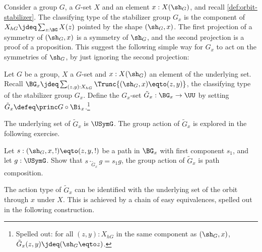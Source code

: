 Consider a group $G$, a $G$-set $X$ and an element $x:X(\sh_G)$,
and recall \cref{def:orbit-stabilizer}.
The classifying type of the stabilizer group $G_x$
is the component of $X_{hG}\jdeq\sum_{z:\BG} X(z)$ 
pointed by the shape $(\sh_G,x)$.
The first projection of a symmetry of $(\sh_G,x)$ is a symmetry of 
$\sh_G$, and the second projection is a proof of a proposition.
This suggest the following simple way for $G_x$ to act on the
symmetries of $\sh_G$, by just ignoring the second projection:


\begin{definition}\label{def:Gx-action-on-G}
Let $G$ be a group, $X$ a $G$-set and $x:X(\sh_G)$ an element of 
the underlying set. Recall 
$\BG_x \jdeq \sum_{(z,y):X_{hG}}\Trunc{(\sh_G,x)\eqto(z,y)}$,
the classifying type of the stabilizer group $G_x$. 
Define the $G_x$-set $\tilde G_x : \BG_x \to \UU$ by setting
$\tilde G_x \defeq \princ G \circ \Bi_x$.\footnote{%
Spelled out:
for all $(z,y):X_{hG}$ in the same component as $(\sh_G,x)$, 
$\tilde G_x(z,y)\jdeq(\sh_G\eqto z)$.
}
\end{definition} 

The underlying set of $\tilde G_x$ is $\USymG$. The group action of
$\tilde G_x$ is explored in the following exercise.

\begin{xca}\label{xca:Gx-action-on-G}
Let $s:(\sh_G,x,!)\eqto(z,y,!)$ be a path in $\BG_x$ with first component
$s_1$, and let $g:\USymG$. Show that $s\cdot_{\tilde G_x} g = s_1 g$, \ie
the group action of $\tilde G_x$ is path composition. 
\end{xca}

The action type of $\tilde G_x$ can be identified with the 
underlying set of the orbit through $x$ under $X$. This is 
achieved by a chain of easy equivalences, spelled
out in the following construction.


